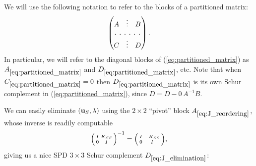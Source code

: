 \documentclass[11pt]{article}
\newcommand{\vecu}{{\bf u}}
\begin{document}
We will use the following notation to refer to the blocks of a partitioned matrix:
\begin{equation}
\label{eq:partitioned_matrix}
\begin{pmatrix}A & \vdots & B\\ \hdotsfor[2]{3}\\C & \vdots & D\end{pmatrix}.
\end{equation}
In particular, we will refer to the diagonal blocks of (\ref{eq:partitioned_matrix}) as $A_{\ref{eq:partitioned_matrix}}$ and $D_{\ref{eq:partitioned_matrix}}$, etc.
Note that when $C_{\ref{eq:partitioned_matrix}} = 0$ then $D_{\ref{eq:partitioned_matrix}}$ is its own Schur complement in ({\ref{eq:partitioned_matrix}}), since
$D = D - 0\,A^{-1} B$.


We can easily eliminate $(\vecu_S, \lambda)$  using the $2\times 2$ ``pivot'' block $A_{\ref{eq:J_reordering}}$, whose inverse is readily computable
\begin{equation}
\label{eq:pivot}
\Bigl(\begin{smallmatrix}I & K_{SS} \\ 0 & I \end{smallmatrix}\Bigr)^{-1} = \Bigl(\begin{smallmatrix}I & -K_{SS} \\ 0 & I \end{smallmatrix}\Bigr),
\end{equation}
giving us a nice SPD $3\times 3$ Schur complement $D_{\ref{eq:J_elimination}}$:
\end{document}

